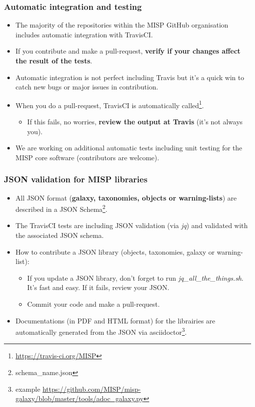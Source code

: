 \begin{frame}[t,plain]
\frametitle{Automatic integration and testing}
\begin{itemize}
\item The majority of the repositories within the MISP GitHub organisation includes automatic integration with TravisCI.
\item If you contribute and make a pull-request, {\bf verify if your changes affect the result of the tests}.
\item Automatic integration is not perfect including Travis but it's a quick win to catch new bugs or major issues in contribution.
\item When you do a pull-request, TravisCI is automatically called\footnote{\url{https://travis-ci.org/MISP}}.
\begin{itemize}
\item If this fails, no worries, {\bf review the output at Travis} (it's not always you).
\end{itemize}
\item We are working on additional automatic tests including unit testing for the MISP core software (contributors are welcome).
\end{itemize}
\end{frame}

\begin{frame}[t,plain]
\frametitle{JSON validation for MISP libraries}
\begin{itemize}
\item All JSON format ({\bf galaxy, taxonomies, objects or warning-lists}) are described in a JSON Schema\footnote{schema\_name.json}.
\item The TravisCI tests are including JSON validation (via \emph{jq}) and validated with the associated JSON schema.
\item How to contribute a JSON library (objects, taxonomies, galaxy or warning-list):
\begin{itemize}
\item If you update a JSON library, don't forget to run \emph{jq\_all\_the\_things.sh}. It's fast and easy. If it fails, review your JSON.
\item Commit your code and make a pull-request.
\end{itemize}
\item Documentations (in PDF and HTML format) for the librairies are automatically generated from the JSON via asciidoctor\footnote{example \url{https://github.com/MISP/misp-galaxy/blob/master/tools/adoc_galaxy.py}}.
\end{itemize}
\end{frame}


